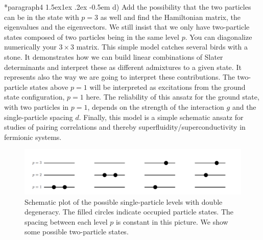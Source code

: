 \documentclass[%
oneside,                 %
final,                   %
10pt]{article}
\makeatletter
\newenvironment{doconceexercise}{}{}
\newcommand\subex{\@startsection*{paragraph}{4}{\z@}%
                  {1.5ex\@plus1ex \@minus.2ex}%
                  {-0.5em}%
                  {\normalfont\normalsize\bfseries}}
\makeatother
\begin{document}
\begin{doconceexercise}
\subex{d)}
Add the possibility that the two particles can be in the state with $p=3$ as well and find the Hamiltonian matrix, the eigenvalues and the eigenvectors. We still insist that we only have two-particle states composed of two particles being in the same level $p$. You can diagonalize numerically your $3\times 3$ matrix.
This simple model catches several birds with a stone. It demonstrates how we can build linear combinations
of Slater determinants and interpret these as different admixtures to a given state. It represents also the way we are going to interpret these contributions.  The two-particle states above $p=1$ will be interpreted as 
excitations from the ground state configuration, $p=1$ here.  The reliability of this ansatz for the ground state, 
with two particles in $p=1$,
depends on the strength of the interaction $g$ and the single-particle spacing $d$.
Finally, this model is a simple schematic ansatz for studies of pairing correlations and thereby superfluidity/superconductivity  
in fermionic systems. 


\begin{figure}[t]
  \centerline{\includegraphics[width=0.6\linewidth]{fig-intro/simplemodel.png}}
  \caption{
  Schematic plot of the possible single-particle levels with double degeneracy. The filled circles indicate occupied particle states. The spacing between each level $p$ is constant in this picture. We show some possible two-particle states.
  }
\end{figure}



\end{doconceexercise}




\printindex
\end{document}
